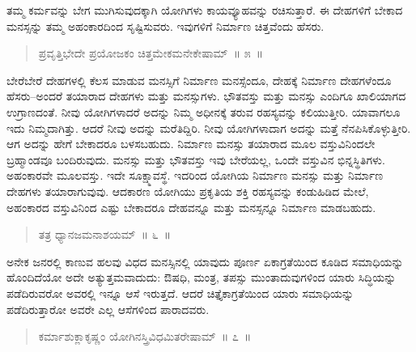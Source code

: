 ತಮ್ಮ ಕರ್ಮವನ್ನು ಬೇಗ ಮುಗಿಸುವುದಕ್ಕಾಗಿ ಯೋಗಿಗಳು ಕಾಯವ್ಯೂಹವನ್ನು ರಚಿಸುತ್ತಾರೆ. ಈ ದೇಹಗಳಿಗೆ ಬೇಕಾದ ಮನಸ್ಸನ್ನು ತಮ್ಮ ಅಹಂಕಾರದಿಂದ ಸೃಷ್ಟಿಸುವರು. ಇವುಗಳಿಗೆ ನಿರ್ಮಾಣ ಚಿತ್ತವೆಂದು ಹೆಸರು. 

\eject

\begin{verse}
ಪ್ರವೃತ್ತಿಭೇದೇ ಪ್ರಯೋಜಕಂ ಚಿತ್ತಮೇಕಮನೇಕೇಷಾಮ್​~॥ ೫~॥
\end{verse}

\vspace{-0.3cm}


ಬೇರೆಬೇರೆ ದೇಹಗಳಲ್ಲಿ ಕೆಲಸ ಮಾಡುವ ಮನಸ್ಸಿಗೆ ನಿರ್ಮಾಣ ಮನಸ್ಸೆಂದೂ, ದೇಹಕ್ಕೆ ನಿರ್ಮಾಣ ದೇಹಗಳೆಂದೂ ಹೆಸರು–ಅಂದರೆ ತಯಾರಾದ ದೇಹಗಳು ಮತ್ತು ಮನಸ್ಸುಗಳು. ಭೌತವಸ್ತು ಮತ್ತು ಮನಸ್ಸು ಎಂದಿಗೂ ಖಾಲಿಯಾಗದ ಉಗ್ರಾಣದಂತೆ. ನೀವು ಯೋಗಿಗಳಾದರೆ ಅದನ್ನು ನಿಮ್ಮ ಅಧೀನಕ್ಕೆ ತರುವ ರಹಸ್ಯವನ್ನು ಕಲಿಯುತ್ತೀರಿ. ಯಾವಾಗಲೂ ಇದು ನಿಮ್ಮದಾಗಿತ್ತು. ಆದರೆ ನೀವು ಅದನ್ನು ಮರೆತಿದ್ದಿರಿ. ನೀವು ಯೋಗಿಗಳಾದಾಗ ಅದನ್ನು ಮತ್ತೆ ನೆನಪಿಸಿಕೊಳ್ಳುತ್ತೀರಿ. ಆಗ ಅದನ್ನು ಹೇಗೆ ಬೇಕಾದರೂ ಬಳಸಬಹುದು. ನಿರ್ಮಾಣ ಮನಸ್ಸು ತಯಾರಾದ ಮೂಲ ವಸ್ತುವಿನಿಂದಲೇ ಬ್ರಹ್ಮಾಂಡವೂ  ಬಂದಿರುವುದು. ಮನಸ್ಸು ಮತ್ತು ಭೌತವಸ್ತು ಇವು ಬೇರೆಯಲ್ಲ, ಒಂದೇ ವಸ್ತುವಿನ ಭಿನ್ನಸ್ಥಿತಿಗಳು. ಅಹಂಕಾರವೇ ಮೂಲವಸ್ತು. ಇದೇ ಸೂಕ್ಷ್ಮಾವಸ್ಥೆ. ಇದರಿಂದ ಯೋಗಿಯ ನಿರ್ಮಾಣ ಮನಸ್ಸು ಮತ್ತು ನಿರ್ಮಾಣ ದೇಹಗಳು ತಯಾರಾಗುವುವು. ಆದಕಾರಣ ಯೋಗಿಯು ಪ್ರಕೃತಿಯ ಶಕ್ತಿ ರಹಸ್ಯವನ್ನು ಕಂಡುಹಿಡಿದ ಮೇಲೆ, ಅಹಂಕಾರದ ವಸ್ತುವಿನಿಂದ ಎಷ್ಟು ಬೇಕಾದರೂ ದೇಹವನ್ನೂ ಮತ್ತು ಮನಸ್ಸನ್ನೂ ನಿರ್ಮಾಣ ಮಾಡಬಹುದು. 

\vspace{-0.3cm}

\begin{verse}
ತತ್ರ ಧ್ಯಾನಜಮನಾಶಯಮ್​~॥ ೬~॥
\end{verse}

\vspace{-0.3cm}


ಅನೇಕ ಜನರಲ್ಲಿ ಕಾಣುವ ಹಲವು ವಿಧದ ಮನಸ್ಸಿನಲ್ಲಿ ಯಾವುದು ಪೂರ್ಣ ಏಕಾಗ್ರತೆಯಿಂದ ಕೂಡಿದ ಸಮಾಧಿಯನ್ನು ಹೊಂದಿದೆಯೋ ಅದೇ ಅತ್ಯುತ್ತಮವಾದುದು: ಔಷಧಿ, ಮಂತ್ರ, ತಪಸ್ಸು ಮುಂತಾದುವುಗಳಿಂದ ಯಾರು ಸಿದ್ಧಿಯನ್ನು ಪಡೆದಿರುವರೋ ಅವರಲ್ಲಿ ಇನ್ನೂ ಆಸೆ ಇರುತ್ತದೆ. ಆದರೆ ಚಿತ್ತೈಕಾಗ್ರತೆಯಿಂದ ಯಾರು ಸಮಾಧಿಯನ್ನು ಪಡೆದಿರುತ್ತಾರೋ ಅವರೇ ಎಲ್ಲ ಆಸೆಗಳಿಂದ ಪಾರಾದವರು. 


\begin{verse}
ಕರ್ಮಾಶುಕ್ಲಾಕೃಷ್ಣಂ ಯೋಗಿನಸ್ತ್ರಿವಿಧಮಿತರೇಷಾಮ್​~॥ ೭~॥
\end{verse}

